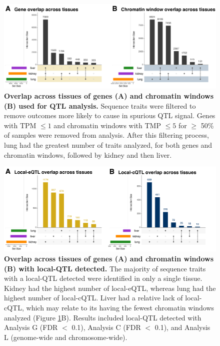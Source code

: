\documentclass[10pt,letterpaper,twoside]{article}
\begin{document}
\clearpage

\begin{figure}[hp]
\renewcommand{\familydefault}{\sfdefault}\normalfont
\centering
\includegraphics[width=\textwidth, trim={0in 0in 0in 0in}, clip]{figs/upset_genes_chromatin.pdf}
\caption{\textbf{Overlap across tissues of genes (A) and chromatin windows (B) used for QTL analysis.} 
Sequence traits were filtered to remove outcomes more likely to cause in spurious QTL signal. Genes with TPM $\le 1$ and chromatin windows with TMP $\le 5$ for $\ge$ 50\% of samples were removed from analysis. After this filtering process, lung had the greatest number of traits analyzed, for both genes and chromatin windows, followed by kidney and then liver. 
\label{fig:upset_genes_chromatin}}
\end{figure}

\clearpage

\begin{figure}[hp]
\renewcommand{\familydefault}{\sfdefault}\normalfont
\centering
\includegraphics[width=\textwidth, trim={0in 0in 0in 0in}, clip]{figs/upset_eqtl_cqtl.pdf}
\caption{\textbf{Overlap across tissues of genes (A) and chromatin windows (B) with local-QTL detected.} 
The majority of sequence traits with a local-QTL detected were identified in only a single tissue. Kidney had the highest number of local-eQTL, whereas lung had the highest number of local-cQTL. Liver had a relative lack of local-cQTL, which may relate to its having the fewest chromatin windows analyzed (Figure \ref{fig:upset_genes_chromatin}B). Results included local-QTL detected with Analysis G (FDR $<$ 0.1), Analysis C (FDR $<$ 0.1), and Analysis L (genome-wide and chromosome-wide). 
\label{fig:upset_eqtl_cqtl}}
\end{figure}
\end{document}
